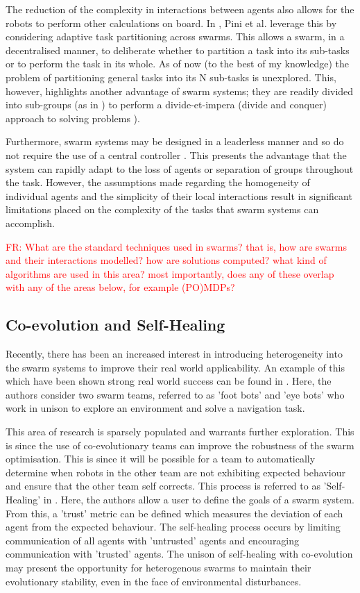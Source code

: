 \documentclass[preprint,11pt]{report}
\newcommand\fr[1]{\textcolor{red}{FR: #1}}
\begin{document}
The reduction of the complexity in interactions between agents also allows for the robots to perform
other calculations on board. In \cite{Pini2011TaskSelection}, Pini et al. leverage this by
considering adaptive task partitioning across swarms. This allows a swarm, in a decentralised
manner, to deliberate whether to partition a task into its sub-tasks or to perform the task in its
whole. As of now (to the best of my knowledge) the problem of partitioning general tasks into its N
sub-tasks is unexplored. This, however, highlights another advantage of swarm systems; they are
readily divided into sub-groups (as in \cite{Zahadat2016DivisionInhibition}) to perform a
divide-et-impera (divide and conquer) approach to solving problems \cite{Pini2011TaskSelection}). 

Furthermore, swarm systems may be designed in a leaderless manner and so do not require the use of a
central controller \cite{Couceiro2015}. This presents the advantage that the system can rapidly
adapt to the loss of agents or separation of groups throughout the task. However, the assumptions
made regarding the homogeneity of individual agents and the simplicity of their local interactions
result in significant limitations placed on the complexity of the tasks that swarm systems can
accomplish.

\fr{What are the standard techniques used in swarms? that is, how are swarms and their interactions modelled? how are solutions computed? what kind of algorithms are used in this area? most importantly, does any of these overlap with any of the areas below, for example (PO)MDPs?}

\subsection{Co-evolution and Self-Healing}

Recently, there has been an increased interest in introducing
heterogeneity into the swarm systems to improve their real world
applicability. An example of this which have been shown strong real
world success can be found in
\cite{DucatelleSelf-organizedSwarms}. Here, the authors consider two
swarm teams, referred to as 'foot bots' and 'eye bots' who work in
unison to explore an environment and solve a navigation task.

This area of research is sparsely populated and warrants further
exploration. This is since the use of co-evolutionary teams can
improve the robustness of the swarm optimisation. This is since it
will be possible for a team to automatically determine when robots in
the other team are not exhibiting expected behaviour and ensure that
the other team self corrects. This process is referred to as
'Self-Healing' in \cite{LiuTrust-Aware}. Here, the authors allow a
user to define the goals of a swarm system. From this, a 'trust'
metric can be defined which measures the deviation of each agent from
the expected behaviour. The self-healing process occurs by limiting
communication of all agents with 'untrusted' agents and encouraging
communication with 'trusted' agents. The unison of self-healing with
co-evolution may present the opportunity for heterogenous swarms to
maintain their evolutionary stability, even in the face of
environmental disturbances.
\end{document}
